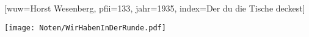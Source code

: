 [wuw={Horst Wesenberg}, pfii={133}, jahr={1935}, index={Der du die Tische deckest}]

\beginverse
\endverse
\centering\texttt{[image: Noten/WirHabenInDerRunde.pdf]}

\endsong
